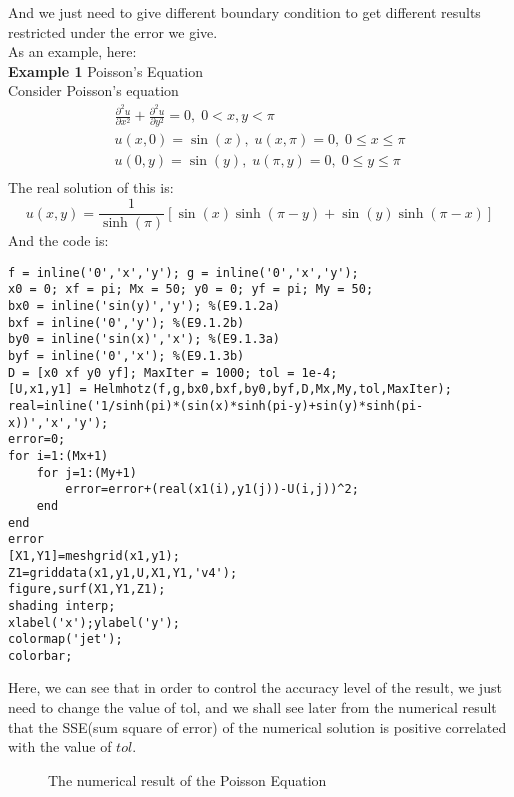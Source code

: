 \documentclass[a4paper]{article}
\begin{document}
And we just need to give different boundary condition to get different results restricted under the error we give.\\
As an example, here:\\
\textbf{Example 1} Poisson's Equation\\
Consider Poisson's equation\\
\begin{equation}
\begin{array}{l}
 \frac{{{\partial ^2}u}}{{\partial {x^2}}} + \frac{{{\partial ^2}u}}{{\partial {y^2}}} = 0,\;0 < x,y < \pi  \\
 u(x,0) = \sin (x),\;u(x,\pi ) = 0,\;0 \le x \le \pi  \\
 u(0,y) = \sin (y),\;u(\pi ,y) = 0,\;0 \le y \le \pi  \\
 \end{array}
\end{equation}
The real solution of this is:\\
\begin{equation}
u(x,y) = \frac{1}{{\sinh (\pi )}}[\sin (x)\sinh (\pi  - y) + \sin (y)\sinh (\pi  - x)]
\end{equation}
And the code is:
\begin{verbatim}
f = inline('0','x','y'); g = inline('0','x','y');
x0 = 0; xf = pi; Mx = 50; y0 = 0; yf = pi; My = 50;
bx0 = inline('sin(y)','y'); %(E9.1.2a)
bxf = inline('0','y'); %(E9.1.2b)
by0 = inline('sin(x)','x'); %(E9.1.3a)
byf = inline('0','x'); %(E9.1.3b)
D = [x0 xf y0 yf]; MaxIter = 1000; tol = 1e-4;
[U,x1,y1] = Helmhotz(f,g,bx0,bxf,by0,byf,D,Mx,My,tol,MaxIter);
real=inline('1/sinh(pi)*(sin(x)*sinh(pi-y)+sin(y)*sinh(pi-x))','x','y');
error=0;
for i=1:(Mx+1)
    for j=1:(My+1)
        error=error+(real(x1(i),y1(j))-U(i,j))^2;
    end
end
error
[X1,Y1]=meshgrid(x1,y1);
Z1=griddata(x1,y1,U,X1,Y1,'v4');
figure,surf(X1,Y1,Z1);
shading interp;
xlabel('x');ylabel('y');
colormap('jet');
colorbar;
\end{verbatim}
Here, we can see that in order to control the accuracy level of the result, we just need to change the value of tol, and we shall see later from the numerical result that the SSE(sum square of error) of the numerical solution is positive correlated with the value of $tol$.
\begin{figure}[H]
\caption{The numerical result of the Poisson Equation}
\end{figure}
\end{document}

